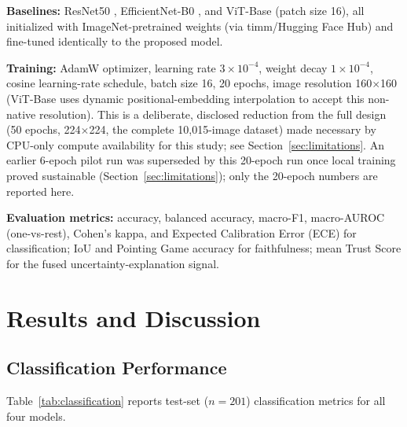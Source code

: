 \documentclass[conference]{IEEEtran}
\begin{document}
\textbf{Baselines:} ResNet50 \cite{he2016}, EfficientNet-B0 \cite{tan2019}, and ViT-Base
\cite{dosovitskiy2021} (patch size 16), all initialized with ImageNet-pretrained weights
(via timm/Hugging Face Hub) and fine-tuned identically to the proposed model.

\textbf{Training:} AdamW optimizer, learning rate $3\times10^{-4}$, weight decay
$1\times10^{-4}$, cosine learning-rate schedule, batch size 16, 20 epochs, image resolution
160$\times$160 (ViT-Base uses dynamic positional-embedding interpolation to accept this
non-native resolution). This is a deliberate, disclosed reduction from the full design (50
epochs, 224$\times$224, the complete 10{,}015-image dataset) made necessary by CPU-only
compute availability for this study; see Section~\ref{sec:limitations}. An earlier 6-epoch
pilot run was superseded by this 20-epoch run once local training proved sustainable
(Section~\ref{sec:limitations}); only the 20-epoch numbers are reported here.

\textbf{Evaluation metrics:} accuracy, balanced accuracy, macro-F1, macro-AUROC
(one-vs-rest), Cohen's kappa, and Expected Calibration Error (ECE) for classification; IoU
and Pointing Game accuracy for faithfulness; mean Trust Score for the fused
uncertainty-explanation signal.

\section{Results and Discussion}

\subsection{Classification Performance}

Table~\ref{tab:classification} reports test-set ($n=201$) classification metrics for all
four models.

\begin{table}[t]
\centering
\caption{Classification performance (test set, $n=201$)}
\label{tab:classification}
\end{table}
\end{document}
